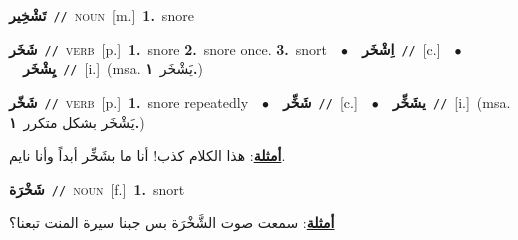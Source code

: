 \documentclass[10pt,a4paper,twoside]{article} %
\begin{document}
\begin{multicols}{2}
{\setlength\topsep{0pt}\textbf{\foreignlanguage{arabic}{تَشْخِير}}\ {\color{gray}\texttt{//}\color{black}}\ \textsc{noun}\ [m.]\ \textbf{1.}~snore\ } \vspace{2mm}

{\setlength\topsep{0pt}\textbf{\foreignlanguage{arabic}{شَخَر}}\ {\color{gray}\texttt{//}\color{black}}\ \textsc{verb}\ [p.]\ \textbf{1.}~snore  \textbf{2.}~snore once.  \textbf{3.}~snort\ \ $\bullet$\ \ \setlength\topsep{0pt}\textbf{\foreignlanguage{arabic}{اِشْخَر}}\ {\color{gray}\texttt{//}\color{black}}\ [c.]\ \ $\bullet$\ \ \setlength\topsep{0pt}\textbf{\foreignlanguage{arabic}{يِشْخَر}}\ {\color{gray}\texttt{//}\color{black}}\ [i.]\ \color{gray}(msa. \foreignlanguage{arabic}{يَشْخَر}~\foreignlanguage{arabic}{\textbf{١.}})\color{black}\ } \vspace{2mm}

{\setlength\topsep{0pt}\textbf{\foreignlanguage{arabic}{شَخّر}}\ {\color{gray}\texttt{//}\color{black}}\ \textsc{verb}\ [p.]\ \textbf{1.}~snore repeatedly\ \ $\bullet$\ \ \setlength\topsep{0pt}\textbf{\foreignlanguage{arabic}{شَخِّر}}\ {\color{gray}\texttt{//}\color{black}}\ [c.]\ \ $\bullet$\ \ \setlength\topsep{0pt}\textbf{\foreignlanguage{arabic}{يشَخِّر}}\ {\color{gray}\texttt{//}\color{black}}\ [i.]\ \color{gray}(msa. \foreignlanguage{arabic}{يَشْخَر بشكل متكرر}~\foreignlanguage{arabic}{\textbf{١.}})\color{black}\  \begin{flushright}\color{gray}\foreignlanguage{arabic}{\textbf{\underline{\foreignlanguage{arabic}{أمثلة}}}: هذا الكلام كذب! أنا ما بشَخِّر أبداً وأنا نايم.}\end{flushright}\color{black}} \vspace{2mm}

{\setlength\topsep{0pt}\textbf{\foreignlanguage{arabic}{شَخْرَة}}\ {\color{gray}\texttt{//}\color{black}}\ \textsc{noun}\ [f.]\ \textbf{1.}~snort\  \begin{flushright}\color{gray}\foreignlanguage{arabic}{\textbf{\underline{\foreignlanguage{arabic}{أمثلة}}}: سمعت صوت الشَّخْرَة بس جبنا سيرة المنت تبعنا؟}\end{flushright}\color{black}} \vspace{2mm}


\end{multicols}
\end{document}
